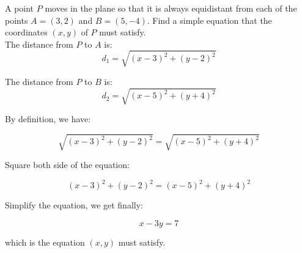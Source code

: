 \documentclass{article}
\begin{document}
A point $P$ moves in the plane so that it is always equidistant from each of the points $A=(3,2)$ and $B=(5,-4)$. Find a simple equation that the coordinates $(x, y)$ of $P$ must satisfy. \\

The distance from $P$ to $A$ is: $$ d_1 = \sqrt{(x-3)^2 + (y-2)^2} $$

The distance from $P$ to $B$ is: $$ d_2 = \sqrt{(x-5)^2 + (y+4)^2} $$

By definition, we have:

$$ \sqrt{(x-3)^2 + (y-2)^2} = \sqrt{(x-5)^2 + (y+4)^2} $$

Square both side of the equation:

$$ (x-3)^2 + (y-2)^2 = (x-5)^2 + (y+4)^2 $$

Simplify the equation, we get finally:

$$ x - 3y = 7 $$

which is the equation $(x,y)$ must satisfy.
\end{document}
